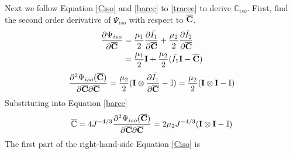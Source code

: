 Next we follow Equation \ref{Ciso} and \ref{barcc} to \ref{tracec} to derive $\mathbb{C}_{iso}$. First, find the second order derivative of $\Psi_{iso}$ with respect to $\overline{\bold{C}}$.
\begin{equation}
\begin{split}
\frac{\partial{\Psi_{iso}}}{\partial{\overline{\bold{C}}}} &= \frac{\mu_1}{2}\frac{\partial{\bar{I_1}}}{\partial{\overline{\bold{C}}}} +  \frac{\mu_2}{2}\frac{\partial{\bar{I_2}}}{\partial{\overline{\bold{C}}}} \\
&= \frac{\mu_1}{2}\bold{I} + \frac{\mu_2}{2}(\bar{I_1}\bold{I} - \overline{\bold{C}})
\end{split}
\end{equation}
\begin{equation}
\frac{\partial^2\Psi_{iso}(\overline{\bold{C}})}{\partial\overline{\bold{C}}\partial\overline{\bold{C}}} = 
\frac{\mu_2}{2}(\bold{I} \otimes \frac{\partial{\bar{I_1}}}{\partial{\overline{\bold{C}}}} - \mathbb{I}) = \frac{\mu_2}{2}(\bold{I} \otimes \bold{I} - \mathbb{I})
\end{equation}
Substituting into Equation \ref{barcc}
\begin{equation}
\overline{\mathbb{C}} = 4J^{-4/3}\frac{\partial^2\Psi_{iso}(\overline{\bold{C}})}{\partial{\overline{\bold{C}}}{\partial{\overline{\bold{C}}}}} = 2\mu_2{J^{-4/3}}(\bold{I} \otimes \bold{I} - \mathbb{I})
\end{equation}
The first part of the right-hand-side Equation \ref{Ciso} is
